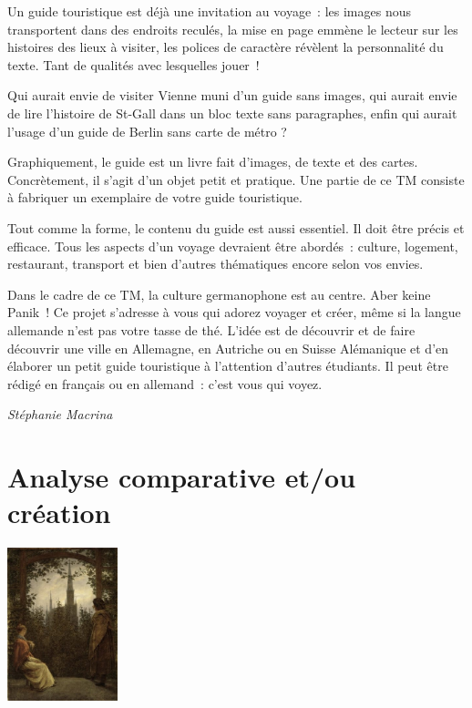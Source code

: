\documentclass[
  10pt,
  french,
  a5paper,
  openany]{book}
\newenvironment{signature}{\begin{flushright}}{\end{flushright}}
\begin{document}
Un guide touristique est déjà une invitation au voyage~: les images nous transportent dans des endroits reculés, la mise en page emmène le lecteur sur les histoires des lieux à visiter, les polices de caractère révèlent la personnalité du texte. Tant de qualités avec lesquelles jouer~!

Qui aurait envie de visiter Vienne muni d'un guide sans images, qui aurait envie de lire l'histoire de St-Gall dans un bloc texte sans paragraphes, enfin qui aurait l'usage d'un guide de Berlin sans carte de métro ?

Graphiquement, le guide est un livre fait d'images, de texte et des cartes. Concrètement, il s'agit d'un objet petit et pratique. Une partie de ce TM consiste à fabriquer un exemplaire de votre guide touristique.

Tout comme la forme, le contenu du guide est aussi essentiel. Il doit être précis et efficace. Tous les aspects d'un voyage devraient être abordés~: culture, logement, restaurant, transport et bien d'autres thématiques encore selon vos envies.

Dans le cadre de ce TM, la culture germanophone est au centre. Aber keine Panik~! Ce projet s'adresse à vous qui adorez voyager et créer, même si la langue allemande n'est pas votre tasse de thé. L'idée est de découvrir et de faire découvrir une ville en Allemagne, en Autriche ou en Suisse Alémanique et d'en élaborer un petit guide touristique à l'attention d'autres étudiants. Il peut être rédigé en français ou en allemand~: c'est vous qui voyez.

\begin{signature}
\emph{Stéphanie Macrina}

\end{signature}

\hypertarget{analyse-comparative-etou-creux301ation}{%
\chapter{Analyse comparative et/ou création}\label{analyse-comparative-etou-creux301ation}}

\begin{center}
\includegraphics[width=\textwidth,height=12em]{images/analyse-comparative-et-ou-creation-1.jpg}

\end{center}
\end{document}

